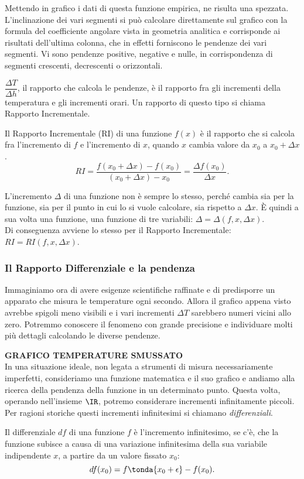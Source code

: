 \begin{esempio}
Mettendo in grafico i dati di questa funzione empirica, ne risulta una 
spezzata. L'inclinazione dei vari segmenti si può calcolare direttamente sul 
grafico con la formula del coefficiente angolare vista in geometria analitica 
e corrisponde ai risultati dell'ultima colonna, che in effetti forniscono le 
pendenze dei vari segmenti.  Vi sono pendenze positive, negative e nulle, in 
corrispondenza di segmenti crescenti, decrescenti o orizzontali. 
 \end{esempio}
 
\(\dfrac{\Delta T}{\Delta h}\), il rapporto che calcola le pendenze, è il 
rapporto fra gli incrementi della temperatura e gli incrementi orari. Un 
rapporto di questo tipo si chiama Rapporto Incrementale.
\begin{definizione}
Il Rapporto Incrementale (RI) di una funzione \(f(x)\) è il rapporto che 
si calcola fra l'incremento di \(f\) e l'incremento di \(x\), quando \(x\) 
cambia valore da \(x_0\) a \(x_0+\Delta x\).
\[
 RI= \frac{f(x_0+\Delta x)-f(x_0)}{(x_0+\Delta x)- x_0}=
 \frac{\Delta f(x_0)}{\Delta x}.
\]
\end{definizione}
L'incremento \(\Delta\) di una funzione non è sempre lo stesso, perché 
cambia sia per la funzione, sia per il punto in cui lo si vuole calcolare, sia 
rispetto a \(\Delta x\). È quindi a sua volta una funzione, una funzione di tre 
variabili: \(\Delta=\Delta(f, x, \Delta x)\). \\
Di conseguenza avviene lo stesso per il Rapporto Incrementale: \(RI=RI(f, x, 
\Delta x)\).

\subsubsection{Il Rapporto Differenziale e la pendenza}
\label{subsubsec:RD}
Immaginiamo ora di avere esigenze scientifiche raffinate e di predisporre 
un apparato che misura le temperature ogni secondo. Allora il grafico appena 
visto avrebbe spigoli meno visibili e i vari incrementi \(\Delta T\) sarebbero 
numeri vicini allo zero. Potremmo conoscere il fenomeno con grande precisione 
e individuare molti più dettagli calcolando le diverse pendenze.

    \textbf{GRAFICO TEMPERATURE SMUSSATO}\\
    
In una situazione ideale, non legata a strumenti di misura necessariamente 
imperfetti, consideriamo una funzione matematica e il suo grafico e andiamo 
alla ricerca della pendenza della funzione in un determinato punto. Questa 
volta, operando nell'insieme \(\IR\), potremo considerare incrementi 
infinitamente piccoli. Per ragioni storiche questi incrementi infinitesimi si
chiamano \emph{differenziali}.
\begin{definizione}
 Il differenziale \(df\) di una funzione \(f\) è l'incremento infinitesimo, se 
c'è, che la funzione subisce a causa di una variazione infinitesima della sua 
variabile indipendente \(x\), a partire da un valore fissato \(x_0\):
\[df(x_0) = f \tonda{x_0 + \epsilon} - f(x_0).\]
\end{definizione}

